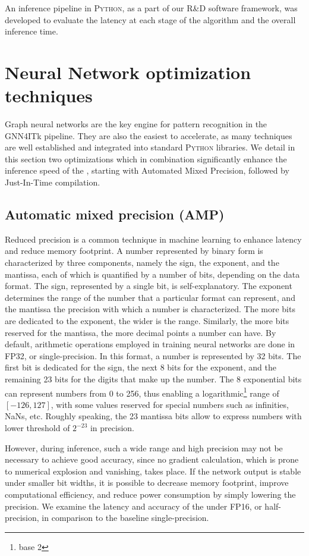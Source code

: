 An inference pipeline in \textsc{Python}, as a part of our \textsc{R\&D} software framework, was developed to evaluate the latency at each stage of the algorithm and the overall inference time.

\section{Neural Network optimization techniques}
\label{sect:opt-techniques}
Graph neural networks are the key engine for pattern recognition in the GNN4ITk pipeline. 
They are also the easiest to accelerate, as many techniques are well established and integrated into standard \textsc{Python} libraries. 
We detail in this section two optimizations which in combination significantly enhance the inference speed of the \ignn, 
starting with Automated Mixed Precision, followed by Just-In-Time compilation.

\subsection{Automatic mixed precision (AMP)}
Reduced precision is a common technique in machine learning to enhance latency and reduce memory footprint.
A number represented by binary form is characterized by three components, namely the sign, the exponent, and the mantissa, 
each of which is quantified by a number of bits, depending on the data format. 
The sign, represented by a single bit, is self-explanatory. 
The exponent determines the range of the number that a particular format can represent, and the mantissa the precision with which a number is characterized. 
The more bits are dedicated to the exponent, the wider is the range.
Similarly, the more bits reserved for the mantissa, the more decimal points a number can have.
By default, arithmetic operations employed in training neural networks are done in FP32, or single-precision.
In this format, a number is represented by 32 bits. 
The first bit is dedicated for the sign, the next 8 bits for the exponent, and the remaining 23 bits for the digits that make up the number. 
The 8 exponential bits can represent numbers from 0 to 256, thus enabling a logarithmic\footnote{base 2} range of $[-126, 127]$, with some values reserved for special numbers such as infinities, NaNs, etc.
Roughly speaking, the 23 mantissa bits allow to express numbers with lower threshold of $2^{-23}$ in precision.

However, during inference, such a wide range and high precision may not be necessary to achieve good accuracy, 
since no gradient calculation, which is prone to numerical explosion and vanishing, takes place. 
If the network output is stable under smaller bit widths, it is possible to decrease memory footprint, 
improve computational efficiency, and reduce power consumption by simply lowering the precision. 
We examine the latency and accuracy of the \ignn under FP16, or half-precision, in comparison to the baseline single-precision.

